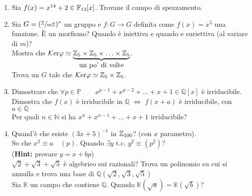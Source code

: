 \documentclass[a4paper,NoNotes]{stdmdoc}
\newcommand{\su}[2]{\sfrac{#1}{#2}}
\newcommand{\PP}{\mathbb{P}}
\newcommand{\QQ}{\mathbb{Q}}
\newcommand{\NN}{\mathbb{N}}
\newcommand{\KK}{\mathbb{K}}
\newcommand{\cart}{\times}
\newcommand{\tc}{\mbox{ t.c. }}
\newcommand{\Hint}{{\bf Hint: }}
\newcommand{\Ker}{\mathcal{K}\mbox{er} }
\begin{document}
\begin{enumerate}
		\item Sia $f(x) = x^{14}+2 \in \FF{13}[x]$. Trovane il campo di spezzamento.
		\item Sia $G = (\su{\ZZ{}}{m\ZZ{}})^*$ un gruppo e $f: G \rightarrow G$ definita come $f(x) = x^5$ una funzione. \`E un morfismo? Quando \`e iniettiva e quando e suriettiva (al variare di $m$)? \\ Mostra che $\Ker \varphi \simeq \underbrace{\ZZ{5}\cart\ZZ{5}\cart\ldots\cart\ZZ{5}}_{\mbox{un po' di volte}}$. \\ Trova un $G$ tale che $\Ker \varphi \simeq \ZZ{5}\cart\ZZ{5}$.
		\item Dimostrare che $\forall p \in \PP \qquad x^{p-1}+x^{p-2}+\ldots+x+1 \in \QQ[x]$ \`e irriducibile. Dimostra che $f(x)$ \`e irriducibile in $\QQ$ $\Leftrightarrow$ $f(x+a)$ \`e irriducibile, con $a \in \QQ$ \\ Per quali $n \in \NN$ si ha $x^n+x^{n-1}+\ldots+x+1$ irriducibile?
		\item Quand'\`e che esiste $(3x+5)^{-1}$ in $\ZZ{100}$? (con $x$ parametro). \\ So che $x^2 \equiv a \quad (p)$. Quando $\exists y \tc y^2 \equiv (p^2)$? \\ (\Hint provare $y=x+bp$) \\ $\sqrt{2}+\sqrt{3}+\sqrt{5}$ \`e algebrico sui razionali? Trova un polinomio su cui si annulla e trova una base di $\QQ(\sqrt{2}, \sqrt{3}, \sqrt{5})$ \\ Sia $\KK$ un campo che contiene $\QQ$. Quando $\KK(\sqrt{a}) = \KK(\sqrt{b})$?
	\end{enumerate}
\end{document}
